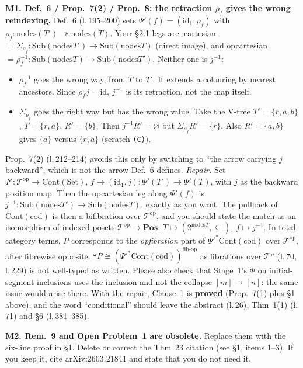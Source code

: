\documentclass[11pt]{article}
\newcommand{\nodes}{\mathrm{nodes}}
\newcommand{\Sub}{\mathrm{Sub}}
\newcommand{\Cont}{\mathrm{Cont}}
\begin{document}
\textbf{M1. Def.~6 / Prop.~7(2) / Prop.~8: the retraction $\rho_f$ gives the wrong reindexing.}
Def.~6 (l.\,195--200) sets $\Psi'(f)=(\mathrm{id}_1,\rho_f)$ with
$\rho_f\colon\nodes(T')\twoheadrightarrow\nodes(T)$. Your \S2.1 legs are:
cartesian $=\Sigma_{\rho_f}\colon\Sub(\nodes T')\to\Sub(\nodes T)$ (direct image), and opcartesian
$=\rho_f^{-1}\colon\Sub(\nodes T)\to\Sub(\nodes T')$. Neither one is $j^{-1}$:
\begin{itemize}[leftmargin=*]
\item $\rho_f^{-1}$ goes the wrong way, from $T$ to $T'$. It extends a colouring by
nearest ancestors. Since $\rho_f j=\mathrm{id}$, $j^{-1}$ is its retraction, not the map itself.
\item $\Sigma_{\rho_f}$ goes the right way but has the wrong value. Take the V-tree $T'=\{r,a,b\}$,
$T=\{r,a\}$, $R'=\{b\}$. Then $j^{-1}R'=\varnothing$ but $\Sigma_{\rho_f}R'=\{r\}$. Also
$R'=\{a,b\}$ gives $\{a\}$ versus $\{r,a\}$ (scratch \texttt{(C)}).
\end{itemize}
Prop.~7(2) (l.\,212--214) avoids this only by switching to ``the arrow carrying $j$ backward'',
which is not the arrow Def.~6 defines. \emph{Repair.} Set $\Psi'\colon\mathcal T^{\mathrm{op}}\to
\Cont(\mathrm{Set})$, $f\mapsto(\mathrm{id}_1,j)\colon\Psi'(T')\to\Psi'(T)$, with $j$ as the backward
position map. Then the opcartesian leg along $\Psi'(f)$ is $j^{-1}\colon\Sub(\nodes T')\to
\Sub(\nodes T)$, exactly as you want. The pullback of $\Cont(\mathrm{cod})$ is then a bifibration
over $\mathcal T^{\mathrm{op}}$, and you should state the match as an isomorphism of indexed
posets $\mathcal T^{\mathrm{op}}\to\mathbf{Pos}$:
$T\mapsto(2^{\nodes T},\subseteq)$, $f\mapsto j^{-1}$. In total-category terms, $P$ corresponds to
the \emph{opfibration} part of $\Psi'^{*}\Cont(\mathrm{cod})$ over $\mathcal T^{\mathrm{op}}$, after
fibrewise opposite. ``$P\cong(\Psi'^*\Cont(\mathrm{cod}))^{\text{fib-op}}$ as fibrations over
$\mathcal T$'' (l.\,70, l.\,229) is not well-typed as written. Please also check that Stage~1's
$\Phi$ on initial-segment inclusions uses the inclusion and not the collapse $[m]\to[n]$: the same
issue would arise there. With the repair, Clause~1 is \textbf{proved} (Prop.~7(1) plus \S1 above),
and the word ``conditional'' should leave the abstract (l.\,26), Thm~1(1) (l.\,71) and \S6
(l.\,381--385).

\textbf{M2. Rem.~9 and Open Problem~1 are obsolete.} Replace them with the six-line proof in
\S1. Delete or correct the Thm~23 citation (see \S1, items 1--3). If you keep it, cite
arXiv:2603.21841 and state that you do not need it.
\end{document}

